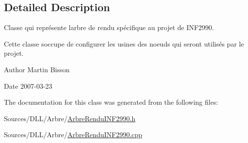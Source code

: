 \subsection{Detailed Description}
Classe qui représente l\textquotesingle{}arbre de rendu spécifique au projet de I\+N\+F2990. 

Cette classe s\textquotesingle{}occupe de configurer les usines des noeuds qui seront utilisés par le projet.

\begin{DoxyAuthor}{Author}
Martin Bisson 
\end{DoxyAuthor}
\begin{DoxyDate}{Date}
2007-\/03-\/23 
\end{DoxyDate}


The documentation for this class was generated from the following files\+:\begin{DoxyCompactItemize}
\item 
Sources/\+D\+L\+L/\+Arbre/\hyperlink{_arbre_rendu_i_n_f2990_8h}{Arbre\+Rendu\+I\+N\+F2990.\+h}\item 
Sources/\+D\+L\+L/\+Arbre/\hyperlink{_arbre_rendu_i_n_f2990_8cpp}{Arbre\+Rendu\+I\+N\+F2990.\+cpp}\end{DoxyCompactItemize}
